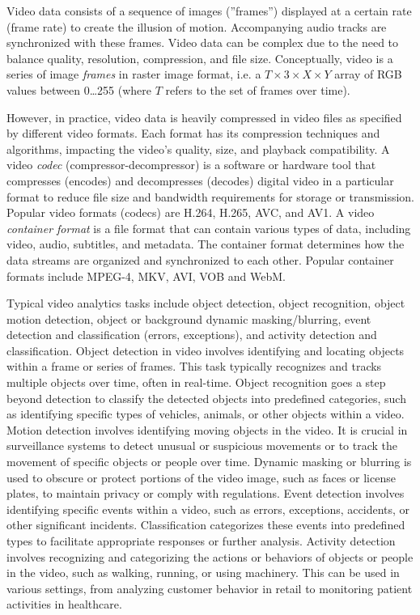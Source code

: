 Video data consists of a sequence of images (''frames'') displayed at a certain rate (frame rate) to create the illusion of motion. Accompanying audio tracks are synchronized with these frames. Video data can be complex due to the need to balance quality, resolution, compression, and file size. Conceptually, video is a series of image \emph{frames} in raster image format, i.e. a $T \times 3 \times X \times Y$ array of RGB values between 0\ldots255 (where $T$ refers to the set of frames over time).

However, in practice, video data is heavily compressed in video files as specified by different video formats. Each format has its compression techniques and algorithms, impacting the video's quality, size, and playback compatibility. A video \emph{codec} (compressor-decompressor) is a software or hardware tool that compresses (encodes) and decompresses (decodes) digital video in a particular format to reduce file size and bandwidth requirements for storage or transmission. Popular video formats (codecs) are H.264, H.265, AVC, and AV1. A video \emph{container format} is a file format that can contain various types of data, including video, audio, subtitles, and metadata. The container format determines how the data streams are organized and synchronized to each other. Popular container formats include MPEG-4, MKV, AVI, VOB and WebM.

Typical video analytics tasks include object detection, object recognition, object motion detection, object or background dynamic masking/blurring, event detection and classification (errors, exceptions), and activity detection and classification. Object detection in video involves identifying and locating objects within a frame or series of frames. This task typically recognizes and tracks multiple objects over time, often in real-time. Object recognition goes a step beyond detection to classify the detected objects into predefined categories, such as identifying specific types of vehicles, animals, or other objects within a video. Motion detection involves identifying moving objects in the video. It is crucial in surveillance systems to detect unusual or suspicious movements or to track the movement of specific objects or people over time. Dynamic masking or blurring is used to obscure or protect portions of the video image, such as faces or license plates, to maintain privacy or comply with regulations. Event detection involves identifying specific events within a video, such as errors, exceptions, accidents, or other significant incidents. Classification categorizes these events into predefined types to facilitate appropriate responses or further analysis.  Activity detection involves recognizing and categorizing the actions or behaviors of objects or people in the video, such as walking, running, or using machinery. This can be used in various settings, from analyzing customer behavior in retail to monitoring patient activities in healthcare.

